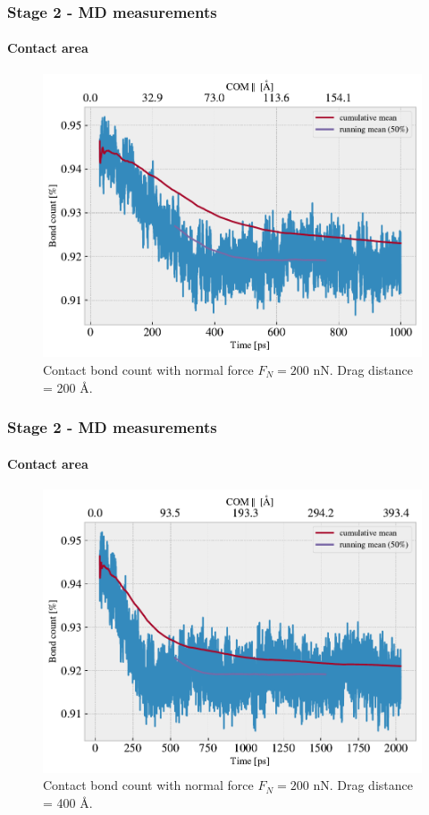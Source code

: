 \documentclass[
	10pt, %
]{beamer}
\begin{document}
\begin{frame}
	\frametitle{Stage 2 - MD measurements}
	\framesubtitle{Contact area}

	
	\begin{figure}
		\includegraphics[width=0.7\linewidth]{figures/contact1.pdf}
		\caption{Contact bond count with normal force $F_N = 200$ nN. Drag distance = 200 Å.}
	\end{figure}	
	
\end{frame}

\begin{frame}
	\frametitle{Stage 2 - MD measurements}
	\framesubtitle{Contact area}

	
	\begin{figure}
		\includegraphics[width=0.7\linewidth]{figures/contact2.pdf}
		\caption{Contact bond count with normal force $F_N = 200$ nN. Drag distance = 400 Å.}
	\end{figure}	
	
\end{frame}
\end{document}

